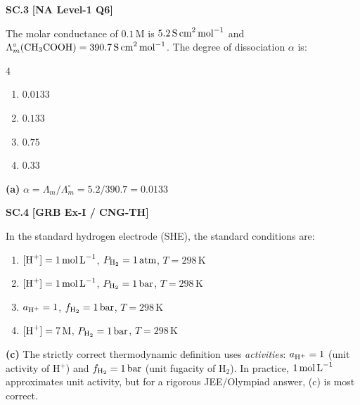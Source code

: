 \begin{problembox}
\textbf{SC.3} \hfill \textbf{[NA Level-1 Q6]}

The molar conductance of $0.1\,\text{M}$  is $5.2\,\text{S\,cm}^2\,\text{mol}^{-1}$ and $\Lambda_m^\circ(\ce{CH3COOH}) = 390.7\,\text{S\,cm}^2\,\text{mol}^{-1}$. The degree of dissociation $\alpha$ is:
\begin{multicols}{4}
\begin{enumerate}[label=(\alph*)]
    \item $0.0133$
    \item $0.133$
    \item $0.75$
    \item $0.33$
\end{enumerate}
\end{multicols}
\end{problembox}
\begin{solution}
\textbf{(a)} $\alpha = \Lambda_m/\Lambda_m^\circ = 5.2/390.7 = 0.0133$
\end{solution}

\begin{problembox}
\textbf{SC.4} \hfill \textbf{[GRB Ex-I / CNG-TH]}

In the standard hydrogen electrode (SHE), the standard conditions are:
\begin{enumerate}[label=(\alph*)]
    \item $[\ce{H+}] = 1\,\text{mol\,L}^{-1}$, $P_{\ce{H2}} = 1\,\text{atm}$, $T = 298\,\text{K}$
    \item $[\ce{H+}] = 1\,\text{mol\,L}^{-1}$, $P_{\ce{H2}} = 1\,\text{bar}$, $T = 298\,\text{K}$
    \item $a_{\ce{H+}} = 1$, $f_{\ce{H2}} = 1\,\text{bar}$, $T = 298\,\text{K}$
    \item $[\ce{H+}] = 7\,\text{M}$, $P_{\ce{H2}} = 1\,\text{bar}$, $T = 298\,\text{K}$
\end{enumerate}
\end{problembox}
\begin{solution}
\textbf{(c)} The strictly correct thermodynamic definition uses \textit{activities}: $a_{\ce{H+}} = 1$ (unit activity of H$^+$) and $f_{\ce{H2}} = 1\,\text{bar}$ (unit fugacity of H$_2$). In practice, $1\,\text{mol\,L}^{-1}$  approximates unit activity, but for a rigorous JEE/Olympiad answer, (c) is most correct.
\end{solution}


